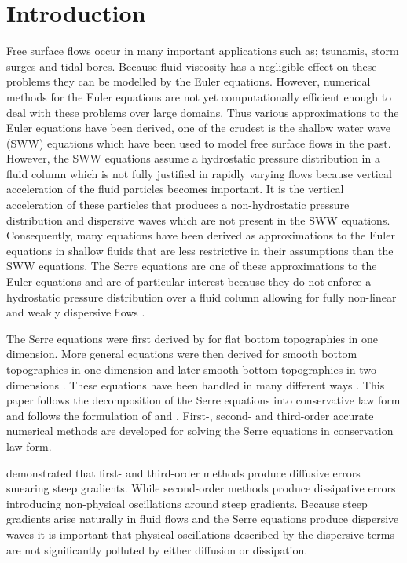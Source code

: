 \documentclass[SingleSpace,12pt,Proceedings]{Serre_ASCE}
\begin{document}
\section{Introduction} \label{intro}
Free surface flows occur in many important applications such as; tsunamis, storm surges and tidal bores. Because fluid viscosity has a negligible effect on these problems they can be modelled by the Euler equations. However, numerical methods for the Euler equations are not yet computationally efficient enough to deal with these problems over large domains. Thus various approximations to the Euler equations have been derived,  one of the crudest is the shallow water wave (SWW) equations which have been used to model free surface flows in the past. However, the SWW equations assume a hydrostatic pressure distribution in a fluid column which is not fully justified in rapidly varying flows because vertical acceleration of the fluid particles becomes important. It is the vertical acceleration of these particles that produces a non-hydrostatic pressure distribution and dispersive waves which are not present in the SWW equations. Consequently, many equations have been derived as approximations to the Euler equations in shallow fluids that are less restrictive in their assumptions than the SWW equations. The Serre equations are one of these approximations to the Euler equations and are of particular interest because they do not enforce a hydrostatic pressure distribution over a fluid column allowing for fully non-linear and weakly dispersive flows \cite{Bonneton-Lannes-2009-16601}. 

The Serre equations were first derived by  for flat bottom topographies in one dimension. More general equations were then derived for smooth bottom topographies in one dimension \cite{Su-Gardener-1969-536} and later smooth bottom topographies in two dimensions \cite{Green-Naghdi-1976-237}. These equations have been handled in many different ways \cite{Dutykh-2014-315,Bonneton-etal-2011-1479,Antunes-do-Carmo-etal-1993-725,Chazel-etal-2011-105,Barthelemy-2006-51-1217,Barthelemy-2007-53-1423,Clamond-2011-315}. This paper follows the decomposition of the Serre equations into conservative law form \cite{Hank-etal-2010-2034,Guyenne-etal-2014-169,Zoppou-2014} and follows the formulation of  and . First-, second- and third-order accurate numerical methods are developed for solving the Serre equations in conservation law form. 

 demonstrated that first- and third-order methods produce diffusive errors smearing steep gradients. While second-order methods produce dissipative errors introducing non-physical oscillations around steep gradients. Because steep gradients arise naturally in fluid flows and the Serre equations produce dispersive waves \cite{El-etal-2006} it is important that physical oscillations described by the dispersive terms are not significantly polluted by either diffusion or dissipation.
\end{document}
